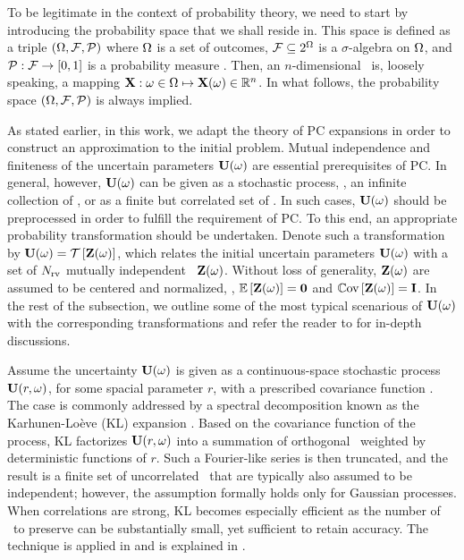 To be legitimate in the context of probability theory, we need to start by introducing the probability space that we shall reside in. This space is defined as a triple $(\Omega, \mathcal{F}, \mathcal{P})$ where $\Omega$ is a set of outcomes, $\mathcal{F} \subseteq 2^\Omega$ is a $\sigma$-algebra on $\Omega$, and $\mathcal{P}: \mathcal{F} \to [0, 1]$ is a probability measure \cite{durrett2010}. Then, an $n$-dimensional \rv\ is, loosely speaking, a mapping $\mathbf{X}: \omega \in \Omega \mapsto \mathbf{X}(\omega) \in \mathbb{R}^n$. In what follows, the probability space $(\Omega, \mathcal{F}, \mathcal{P})$ is always implied.

As stated earlier, in this work, we adapt the theory of PC expansions in order to construct an approximation to the initial problem. Mutual independence and finiteness of the uncertain parameters $\mathbf{U}(\omega)$ are essential prerequisites of PC. In general, however, $\mathbf{U}(\omega)$ can be given as a stochastic process, \ie, an infinite collection of \rvs, or as a finite but correlated set of \rvs. In such cases, $\mathbf{U}(\omega)$ should be preprocessed in order to fulfill the requirement of PC. To this end, an appropriate probability transformation should be undertaken. Denote such a transformation by $\mathbf{U}(\omega) = \mathcal{T}\left[\mathbf{Z}(\omega)\right]$, which relates the initial uncertain parameters $\mathbf{U}(\omega)$ with a set of ${N_\text{rv}}$ mutually independent \rvs\ $\mathbf{Z}(\omega)$. Without loss of generality, $\mathbf{Z}(\omega)$ are assumed to be centered and normalized, \ie, $\oExp{\vZ(\o)} = \mZero$ and $\oCov{\vZ(\o)} = \mI$. In the rest of the subsection, we outline some of the most typical scenarious of $\mathbf{U}(\omega)$ with the corresponding transformations and refer the reader to \cite{xiu2010, eldred2009} for in-depth discussions.

Assume the uncertainty $\mathbf{U}(\omega)$ is given as a continuous-space stochastic process $\mathbf{U}(r, \omega)$, for some spacial parameter $r$, with a prescribed covariance function \cite{durrett2010}. The case is commonly addressed by a spectral decomposition known as the Karhunen-Lo\`{e}ve (KL) expansion \cite{xiu2010, maitre2010, ghanem1991}. Based on the covariance function of the process, KL factorizes $\mathbf{U}(r, \omega)$ into a summation of orthogonal \rvs\ weighted by deterministic functions of $r$. Such a Fourier-like series is then truncated, and the result is a finite set of uncorrelated \rvs\ that are typically also assumed to be independent; however, the assumption formally holds only for Gaussian processes. When correlations are strong, KL becomes especially efficient as the number of \rvs\ to preserve can be substantially small, yet sufficient to retain accuracy. The technique is applied in  and is explained in .

